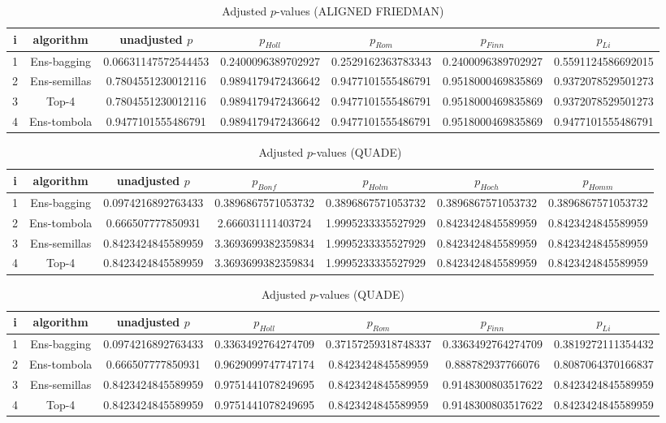 \documentclass[a4paper,10pt]{article}
\begin{document}
\begin{landscape}
\begin{table}[!htp]
\centering\scriptsize
\caption{Adjusted $p$-values (ALIGNED FRIEDMAN)}
\begin{tabular}{ccccccc}
i&algorithm&unadjusted $p$&$p_{Holl}$&$p_{Rom}$&$p_{Finn}$&$p_{Li}$\\
\hline
1&Ens-bagging&0.06631147572544453&0.2400096389702927&0.2529162363783343&0.2400096389702927&0.5591124586692015\\
2&Ens-semillas&0.7804551230012116&0.9894179472436642&0.9477101555486791&0.9518000469835869&0.9372078529501273\\
3&Top-4&0.7804551230012116&0.9894179472436642&0.9477101555486791&0.9518000469835869&0.9372078529501273\\
4&Ens-tombola&0.9477101555486791&0.9894179472436642&0.9477101555486791&0.9518000469835869&0.9477101555486791\\
\hline
\end{tabular}
\end{table}


\newpage

\begin{table}[!htp]
\centering\scriptsize
\caption{Adjusted $p$-values (QUADE)}
\begin{tabular}{ccccccc}
i&algorithm&unadjusted $p$&$p_{Bonf}$&$p_{Holm}$&$p_{Hoch}$&$p_{Homm}$\\
\hline
1&Ens-bagging&0.0974216892763433&0.3896867571053732&0.3896867571053732&0.3896867571053732&0.3896867571053732\\
2&Ens-tombola&0.666507777850931&2.666031111403724&1.9995233335527929&0.8423424845589959&0.8423424845589959\\
3&Ens-semillas&0.8423424845589959&3.3693699382359834&1.9995233335527929&0.8423424845589959&0.8423424845589959\\
4&Top-4&0.8423424845589959&3.3693699382359834&1.9995233335527929&0.8423424845589959&0.8423424845589959\\
\hline
\end{tabular}
\end{table}

\begin{table}[!htp]
\centering\scriptsize
\caption{Adjusted $p$-values (QUADE)}
\begin{tabular}{ccccccc}
i&algorithm&unadjusted $p$&$p_{Holl}$&$p_{Rom}$&$p_{Finn}$&$p_{Li}$\\
\hline
1&Ens-bagging&0.0974216892763433&0.3363492764274709&0.37157259318748337&0.3363492764274709&0.3819272111354432\\
2&Ens-tombola&0.666507777850931&0.9629099747747174&0.8423424845589959&0.888782937766076&0.8087064370166837\\
3&Ens-semillas&0.8423424845589959&0.9751441078249695&0.8423424845589959&0.9148300803517622&0.8423424845589959\\
4&Top-4&0.8423424845589959&0.9751441078249695&0.8423424845589959&0.9148300803517622&0.8423424845589959\\
\hline
\end{tabular}
\end{table}

\end{landscape}
\end{document}
